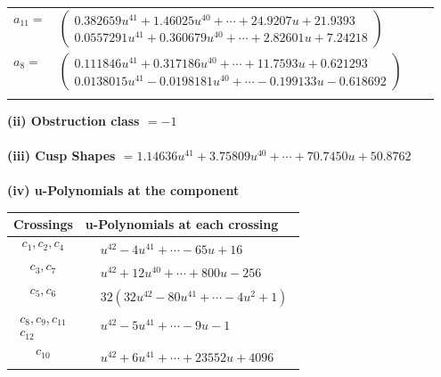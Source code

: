 \documentclass[1p]{elsarticle_modified}
\theoremstyle{definition}
\begin{document}
\begin{tabular}{m{7pt} m{180pt} m{7pt} m{180pt} }
\flushright $a_{11}=$&$\begin{pmatrix}0.382659 u^{41}+1.46025 u^{40}+\cdots+24.9207 u+21.9393\\0.0557291 u^{41}+0.360679 u^{40}+\cdots+2.82601 u+7.24218\end{pmatrix}$ \\
\flushright $a_{8}=$&$\begin{pmatrix}0.111846 u^{41}+0.317186 u^{40}+\cdots+11.7593 u+0.621293\\0.0138015 u^{41}-0.0198181 u^{40}+\cdots-0.199133 u-0.618692\end{pmatrix}$\\&\end{tabular}
\flushleft \textbf{(ii) Obstruction class $= -1$}\\~\\
\flushleft \textbf{(iii) Cusp Shapes $= 1.14636 u^{41}+3.75809 u^{40}+\cdots+70.7450 u+50.8762$}\\~\\
\newpage\renewcommand{\arraystretch}{1}
\flushleft \textbf{(iv) u-Polynomials at the component}\newline \\
\begin{tabular}{m{50pt}|m{274pt}}
Crossings & \hspace{64pt}u-Polynomials at each crossing \\
\hline $$\begin{aligned}c_{1},c_{2},c_{4}\end{aligned}$$&$\begin{aligned}
&u^{42}-4 u^{41}+\cdots-65 u+16
\end{aligned}$\\
\hline $$\begin{aligned}c_{3},c_{7}\end{aligned}$$&$\begin{aligned}
&u^{42}+12 u^{40}+\cdots+800 u-256
\end{aligned}$\\
\hline $$\begin{aligned}c_{5},c_{6}\end{aligned}$$&$\begin{aligned}
&32(32 u^{42}-80 u^{41}+\cdots-4 u^2+1)
\end{aligned}$\\
\hline $$\begin{aligned}c_{8},c_{9},c_{11}\\c_{12}\end{aligned}$$&$\begin{aligned}
&u^{42}-5 u^{41}+\cdots-9 u-1
\end{aligned}$\\
\hline $$\begin{aligned}c_{10}\end{aligned}$$&$\begin{aligned}
&u^{42}+6 u^{41}+\cdots+23552 u+4096
\end{aligned}$\\
\hline
\end{tabular}\\~\\
\end{document}
